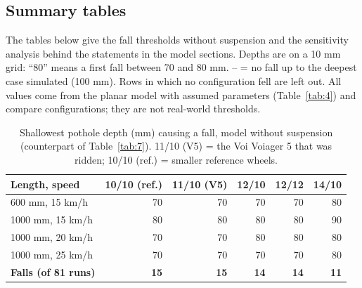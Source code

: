 \FloatBarrier
\subsection{Summary tables}

The tables below give the fall thresholds without suspension and the sensitivity analysis behind the statements in the model sections. Depths are on a 10 mm grid: ``80'' means a first fall between 70 and 80 mm. -- = no fall up to the deepest case simulated (100 mm). Rows in which no configuration fell are left out. All values come from the planar model with assumed parameters (Table~\ref{tab:4}) and compare configurations; they are not real-world thresholds.

\begin{table}[htbp]
\centering\small
\caption{Shallowest pothole depth (mm) causing a fall, model without suspension (counterpart of Table~\ref{tab:7}). 11/10 (V5) = the Voi Voiager 5 that was ridden; 10/10 (ref.) = smaller reference wheels.}\label{tab:Enofork}
\begin{tabular}{@{}lrrrrr@{}}
\toprule
Length, speed & 10/10 (ref.) & 11/10 (V5) & 12/10 & 12/12 & 14/10 \\
\midrule
600 mm, 15 km/h & 70 & 70 & 70 & 70 & 80 \\
1000 mm, 15 km/h & 80 & 80 & 80 & 80 & 90 \\
1000 mm, 20 km/h & 70 & 70 & 80 & 80 & 80 \\
1000 mm, 25 km/h & 70 & 70 & 70 & 70 & 80 \\
\textbf{Falls (of 81 runs)} & \textbf{15} & \textbf{15} & \textbf{14} & \textbf{14} & \textbf{11} \\
\bottomrule
\end{tabular}
\end{table}

